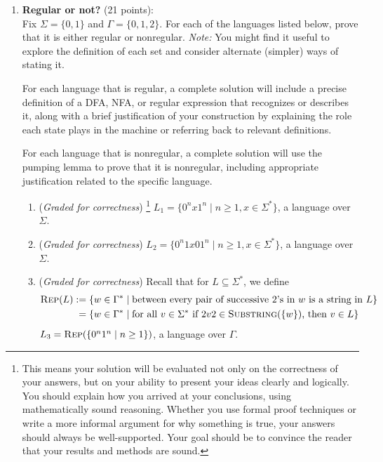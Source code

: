 \documentclass[12pt, oneside]{article}
\newcommand{\gradeCorrect}{({\it Graded for correctness}) }
\newcommand{\gradeCorrectFirst}{\gradeCorrect\footnote{This means your solution 
will be evaluated not only on the correctness of your answers, but on your ability
to present your ideas clearly and logically. You should explain how you 
arrived at your conclusions, using
mathematically sound reasoning. Whether you use formal proof techniques or 
write a more informal argument
for why something is true, your answers should always be well-supported. 
Your goal should be to convince the
reader that your results and methods are sound.} }
\newcommand{\SUBSTRING}{\textsc{Substring}}
\newcommand{\REP}{\textsc{Rep}}
\begin{document}
\begin{enumerate} 



\item \textbf{Regular or not?} (21 points):\\
Fix $\Sigma = \{0,1\}$ and $\Gamma = \{0,1,2\}$.
For each of the languages listed below, 
prove that it is either regular or nonregular. {\it Note:} You might find it useful to 
explore the definition of each set and 
consider alternate (simpler) ways of stating it.

For each language that is regular, a complete 
solution will include a 
precise definition of a DFA, NFA, or regular 
expression that recognizes or describes it, along 
with a brief justification
of your construction by explaining the role each 
state plays in the machine
or referring back to relevant definitions.

For each language that is nonregular, a complete
solution will use the pumping lemma to prove that it is nonregular, 
including appropriate
justification related to the specific language.

\begin{enumerate}
    \item\gradeCorrectFirst $L_1 = \{0^n x 1^n \mid n \ge 1, x \in \Sigma^*\}$, a language over $\Sigma$.
    \item\gradeCorrect $L_2 = \{0^n 1 x 0 1^n \mid n 
    \ge 1, x \in \Sigma^* \}$, a language over 
    $\Sigma$.
    \item\gradeCorrect 
    Recall that for $L \subseteq \Sigma^*$, we define
    \begin{align*}
    \REP(L) &:= \{ w \in \Gamma^* \mid \text{between every pair of successive $2$'s in $w$ is a string in $L$}\}\\
    &\phantom{:}=\{w \in \Gamma^* \mid \text{for all } v \in \Sigma^* \text{ if } 2v2 \in \SUBSTRING(\{w\})  \text{, then } v \in L\} 
    \end{align*}
    $L_3 = \REP( \{ 0^n 1^n \mid n \geq 1 \} )$, 
    a language over $\Gamma$.
\end{enumerate}





\end{enumerate}
\end{document}
